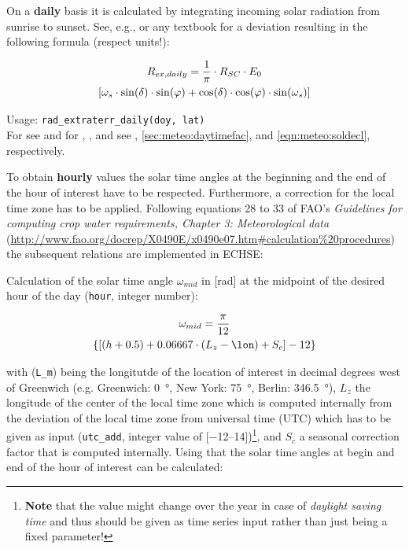 On a \textbf{daily} basis it is calculated by integrating incoming solar radiation from sunrise to sunset. See, e.g., \citet{Neitsch2011} or any textbook for a deviation resulting in the following formula (respect units!):

\begin{multline}\label{eqn:meteo:radex_d}
R_{ex,daily}{} = \frac{1}{\pi} \cdot R_{SC}{} \cdot E_{0}{} \\
\left[ \omega_{s}{} \cdot \sin(\delta{}) \cdot \sin(\varphi{}) + \cos(\delta{}) \cdot \cos(\varphi{}) \cdot \sin(\omega_{s}{}) \right]
\end{multline}

\noindent
Usage:
\verb!rad_extraterr_daily(doy, lat)!\\

For \solarConstant{} see  and for \eccCorr{}, \dayTimeFac{}, and \solDecl{} see , \ref{sec:meteo:daytimefac}, and \ref{eqn:meteo:soldecl}, respectively.

To obtain \textbf{hourly} values the solar time angles at the beginning and the end of the hour of interest have to be respected. Furthermore, a correction for the local time zone has to be applied. Following equations 28 to 33 of FAO's \emph{Guidelines for computing crop water requirements, Chapter 3: Meteorological data} (\url{http://www.fao.org/docrep/X0490E/x0490e07.htm#calculation\%20procedures}) the subsequent relations are implemented in ECHSE:

\noindent
Calculation of the solar time angle $\omega_{mid}$ in [\si{\radian}] at the midpoint of the desired hour of the day \hour{} (\verb!hour!, integer number):

\begin{multline}\label{eqn:meteo:radex_h:w_mid}
\omega_{mid} = \frac{\pi}{12} \\
\left\{ \left[ (h + 0.5) + 0.06667 \cdot (L_z - \lon) + S_c \right] - 12 \right\}
\end{multline}

\noindent
with \lon{} (\verb!L_m!) being the longitutde of the location of interest in decimal degrees west of Greenwich (e.g. Greenwich: \SI{0}{\degree}, New York: \SI{75}{\degree}, Berlin: \SI{346.5}{\degree}), $L_z$ the longitude of the center of the local time zone which is computed internally from the deviation of the local time zone from universal time (UTC) which has to be given as input (\verb!utc_add!, integer value of [\numrange[range-phrase=..]{-12}{14}])\footnote{\textbf{Note} that the value might change over the year in case of \emph{daylight saving time} and thus should be given as time series input rather than just being a fixed parameter!}, and $S_c$ a seasonal correction factor that is computed internally. Using that the solar time angles at begin and end of the hour of interest can be calculated:

